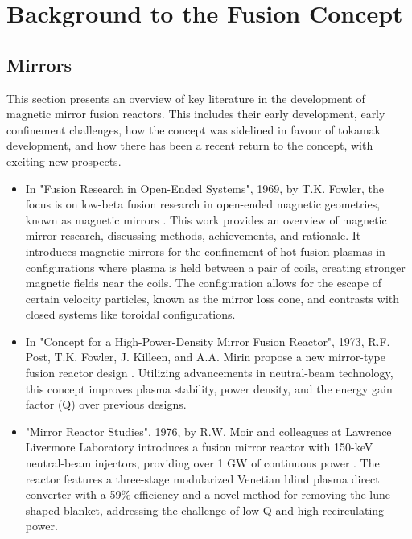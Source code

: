 

\section{Background to the Fusion Concept}

\subsection{Mirrors}
This section presents an overview of key literature in the development of magnetic mirror fusion reactors. This includes their early development, early confinement challenges, how the concept was sidelined in favour of tokamak development, and how there has been a recent return to the concept, with exciting new prospects. 

\begin{itemize}
    \item In "Fusion Research in Open-Ended Systems", 1969, by T.K. Fowler, the focus is on low-beta fusion research in open-ended magnetic geometries, known as magnetic mirrors \cite{fowler1969fusion}. This work provides an overview of magnetic mirror research, discussing methods, achievements, and rationale. It introduces magnetic mirrors for the confinement of hot fusion plasmas in configurations where plasma is held between a pair of coils, creating stronger magnetic fields near the coils. The configuration allows for the escape of certain velocity particles, known as the mirror loss cone, and contrasts with closed systems like toroidal configurations.

 \item In "Concept for a High-Power-Density Mirror Fusion Reactor", 1973, R.F. Post, T.K. Fowler, J. Killeen, and A.A. Mirin propose a new mirror-type fusion reactor design \cite{post1973concept}. Utilizing advancements in neutral-beam technology, this concept improves plasma stability, power density, and the energy gain factor (Q) over previous designs.

 \item "Mirror Reactor Studies", 1976, by R.W. Moir and colleagues at Lawrence Livermore Laboratory introduces a fusion mirror reactor with 150-keV neutral-beam injectors, providing over 1 GW of continuous power \cite{moir1976mirror}. The reactor features a three-stage modularized Venetian blind plasma direct converter with a 59\% efficiency and a novel method for removing the lune-shaped blanket, addressing the challenge of low Q and high recirculating power.


\end{itemize}
